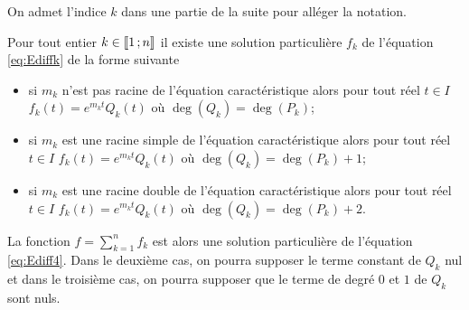 On admet l'indice \(k\) dans une partie de la suite pour alléger la notation.

\begin{theo}
  Pour tout entier \(k \in \mathopen{\llbracket}1\mathclose{}\mathpunct{};n\mathclose{\rrbracket}\) il existe une solution 
  particulière \(f_k\) de l'équation \eqref{eq:Ediffk} de la forme suivante
  \begin{itemize}
    \item si \(m_k\) n'est pas racine de l'équation caractéristique alors 
      pour tout réel \(t \in I\) \(f_k(t) = e^{m_k t} Q_k(t)\) où 
      \(\deg(Q_k) = \deg(P_k)\);
    \item si \(m_k\) est une racine simple de l'équation caractéristique 
      alors pour tout réel \(t \in I\) \(f_k(t) = e^{m_k t} Q_k(t)\) où 
      \(\deg(Q_k) = \deg(P_k) + 1\);
    \item si \(m_k\) est une racine double de l'équation caractéristique 
      alors pour tout réel \(t \in I\) \(f_k(t) = e^{m_k t} Q_k(t)\) où 
      \(\deg(Q_k) = \deg(P_k) + 2\).
  \end{itemize}
  La fonction \(f = \sum_{k = 1}^{n} f_k\) est alors une solution particulière 
  de l'équation \eqref{eq:Ediff4}. Dans le deuxième cas, on pourra supposer le 
  terme constant de \(Q_k\) nul et dans le troisième cas, on pourra supposer 
  que le terme de degré \(0\) et \(1\) de \(Q_k\) sont nuls.
\end{theo}

